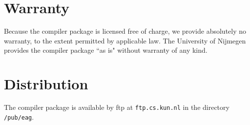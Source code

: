 \section*{Warranty}
Because the \EAG compiler package is licensed free of charge, we
provide absolutely no warranty, to the extent permitted by
applicable law. The University of Nijmegen provides the \EAG
compiler package ``as is" without warranty of any kind.
\section*{Distribution}
The \EAG compiler package is available by ftp at {\tt ftp.cs.kun.nl}
in the directory {\tt /pub/eag}.
